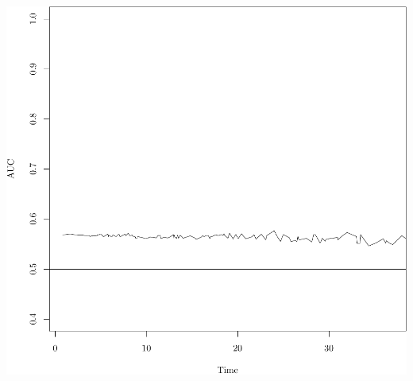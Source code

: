 \documentclass{article}\usepackage[]{graphicx}\usepackage[]{color}
\makeatletter
\def\maxwidth{ %
  \ifdim\Gin@nat@width>\linewidth
    \linewidth
  \else
    \Gin@nat@width
  \fi
}
\newenvironment{knitrout}{}{} %
\makeatother
\begin{document}
\begin{knitrout}
{\centering \includegraphics[width=\maxwidth]{figure/05-risksetROC-10} 

}



\end{knitrout}
\end{document}
